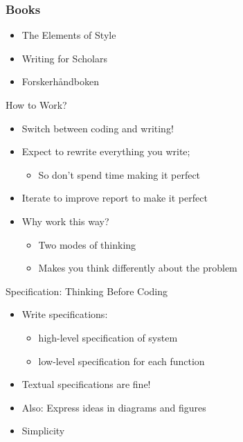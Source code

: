 \documentclass[hyperref={pdfpagelabels=false}, aspectratio=1610,handout]{beamer}
\begin{document}
\begin{frame}
\frametitle{Books}
\begin{block}{}
 \begin{itemize}
  \item The Elements of Style
  \item Writing for Scholars
  \item Forskerhåndboken
 \end{itemize}
\end{block}
\end{frame}

\begin{frame}
\begin{block}{How to Work?}
 \begin{itemize}
  \item<2-> Switch between coding and writing!
  \item<3-> Expect to rewrite everything you write; 
  \begin{itemize}
  	\item<3-> So don't spend time making it perfect 
  \end{itemize}
  \item<4-> Iterate to improve report to make it perfect
  \item<5-> Why work this way?
  \begin{itemize}
	\item<6-> Two modes of thinking
  	\item<6-> Makes you think differently about the problem 
  \end{itemize}
 \end{itemize}
\end{block}
\end{frame}

\begin{frame}
\begin{block}{Specification: Thinking Before Coding}
 \begin{itemize}
  \item Write specifications:
  \begin{itemize}
  	\item high-level specification of system
	\item low-level specification for each function
  \end{itemize}
  \item Textual specifications are fine!
  \item Also: Express ideas in diagrams and figures
  \item Simplicity
 \end{itemize}
\end{block}
\end{frame}
\end{document}

